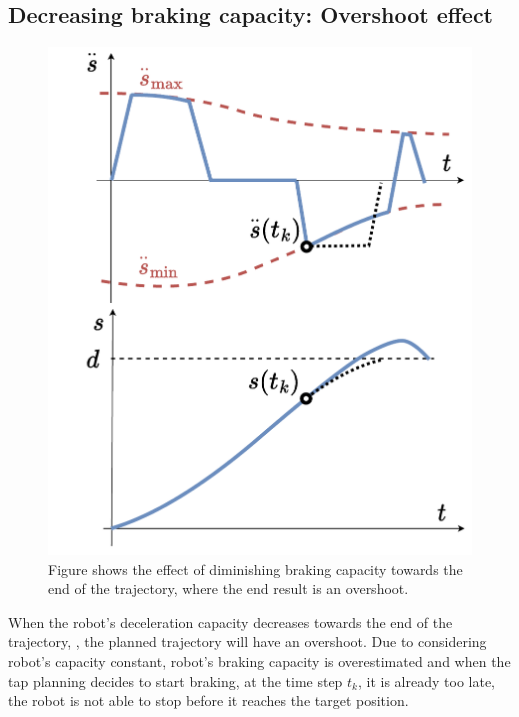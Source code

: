 \subsection{Decreasing braking capacity: Overshoot effect} 
\label{ch:overshoot}
\begin{figure}
\vspace{-0.5cm}
    \centering
    \includegraphics[width=\linewidth]{Papers/imgs/overshoot_expl1.pdf}
    \caption{Figure shows the effect of diminishing braking capacity towards the end of the trajectory, where the end result is an overshoot. }
    \label{fig:overshoot_expl}
\end{figure}
When the robot's deceleration capacity decreases towards the end of the trajectory, , the planned trajectory will have an overshoot. Due to considering robot's capacity constant, robot's braking capacity is overestimated and when the \gls{tap} planning decides to start braking, at the time step $t_k$, it is already too late, the robot is not able to stop before it reaches the target position. 


